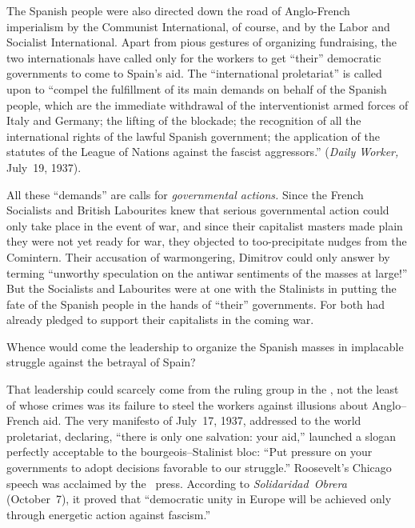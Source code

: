 The Spanish people were also directed down the road of Anglo-French imperialism by the Communist International, of course, and by the Labor and Socialist International. Apart from pious gestures of organizing fundraising, the two internationals have called only for the workers to get ``their'' democratic governments to come to Spain’s aid. The ``international proletariat'' is called upon to ``compel the fulfillment of its main demands on behalf of the Spanish people, which are the immediate withdrawal of the interventionist armed forces of Italy and Germany; the lifting of the blockade; the recognition of all the international rights of the lawful Spanish government; the application of the statutes of the League of Nations against the fascist aggressors.\kn\kn'' (\emph{Daily Worker,} July~19, 1937).

All these ``demands'' are calls for \emph{governmental actions.} Since the French Socialists and British Labourites knew that serious governmental action could only take place in the event of war\kn, and since their capitalist masters made plain they were not yet ready for war\kn, they objected to too-precipitate nudges from the Comintern. Their accusation of warmongering, Dimitrov could only answer by terming ``unworthy speculation on the antiwar sentiments of the masses at large!'' But the Socialists and Labourites were at one with the Stalinists in putting the fate of the Spanish people in the hands of ``their'' governments. For both had already pledged to support their capitalists in the coming war.

\dinkus

\begin{sloppypar}
  Whence would come the leadership to organize the Spanish masses in implacable struggle against the betrayal of Spain?
\end{sloppypar}

\medskip

That leadership could scarcely come from the ruling group in the \CNT\kn, not the least of whose crimes was its failure to steel the workers against illusions about Anglo--French aid. The very manifesto of July~17, 1937, addressed to the world proletariat, declaring, ``there is only one salvation: your aid,\kn\kn'' launched a slogan perfectly acceptable to the bourgeois--Stalinist bloc: ``Put pressure on your governments to adopt decisions favorable to our struggle.\kn\kn'' Roosevelt’s Chicago speech was acclaimed by the \CNT\ press. According to \emph{Solidaridad~Obrera} (October~7), it proved that ``democratic unity in Europe will be achieved only through energetic action against fascism.\kn\kn''

